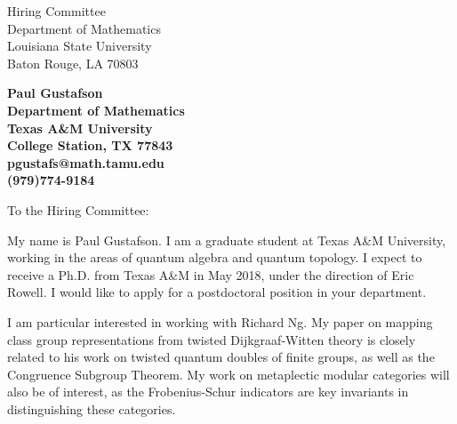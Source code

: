 \documentclass[11pt]{letter} %
\begin{document}

\begin{letter}{Hiring Committee \\
Department of Mathematics \\
Louisiana State University \\
Baton Rouge, LA 70803}


\begin{center}
\large\bf Paul Gustafson \\ %
Department of Mathematics \\ Texas A\&M University \\ College Station, TX 77843 \\ pgustafs@math.tamu.edu \\ (979)774-9184 %
\end{center} 
\vfill



\opening{To the Hiring Committee:}

My name is Paul Gustafson. I am a graduate student at Texas A\&M University, working in the areas of quantum algebra and quantum topology. I expect to receive a Ph.D. from Texas A\&M in May 2018, under the direction of Eric Rowell. I would like to apply for a postdoctoral position in your department.

I am particular interested in working with Richard Ng. My paper on mapping class group representations from twisted Dijkgraaf-Witten theory is closely related to his work on twisted quantum doubles of finite groups, as well as the Congruence Subgroup Theorem.   My work on metaplectic modular categories will also be of interest, as the Frobenius-Schur indicators are key invariants in distinguishing these categories.


\end{letter}
\end{document}
